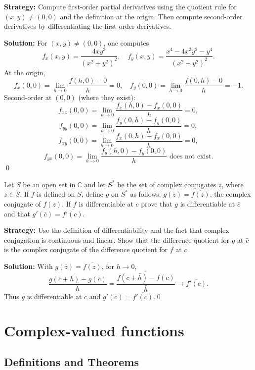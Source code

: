 \noindent\textbf{Strategy:} Compute first-order partial derivatives using the quotient rule for \( (x, y) \neq (0, 0) \) and the definition at the origin. Then compute second-order derivatives by differentiating the first-order derivatives.

\bigskip\noindent\textbf{Solution:}
For $(x,y)\ne(0,0)$, one computes
\[f_x(x,y)=\frac{4xy^3}{(x^2+y^2)^2},\quad f_y(x,y)=\frac{x^4-4x^2y^2-y^4}{(x^2+y^2)^2}.\]
At the origin,
\[f_x(0,0)=\lim_{h\to 0}\frac{f(h,0)-0}{h}=0,\quad f_y(0,0)=\lim_{h\to 0}\frac{f(0,h)-0}{h}=-1.\]
Second-order at $(0,0)$ (where they exist):
\[f_{xx}(0,0)=\lim_{h\to 0}\frac{f_x(h,0)-f_x(0,0)}{h}=0,\] 
\[f_{yy}(0,0)=\lim_{h\to 0}\frac{f_y(0,h)-f_y(0,0)}{h}=0,\]
\[f_{xy}(0,0)=\lim_{h\to 0}\frac{f_x(0,h)-f_x(0,0)}{h}=0,\]
\[f_{yx}(0,0)=\lim_{h\to 0}\frac{f_y(h,0)-f_y(0,0)}{h}\text{ does not exist}.\]\qed


\begin{problembox}
\begin{problemstatement}
Let \( S \) be an open set in \( \mathbb{C} \) and let \( S^* \) be the set of complex conjugates \( \bar{z} \), where \( z \in S \). If \( f \) is defined on \( S \), define \( g \) on \( S^* \) as follows: \( g(\bar{z}) = \overline{f(z)} \), the complex conjugate of \( f(z) \). If \( f \) is differentiable at \( c \) prove that \( g \) is differentiable at \( \bar{c} \) and that \( g'(\bar{c}) = \overline{f'(c)} \).
\end{problemstatement}
\end{problembox}

\noindent\textbf{Strategy:} Use the definition of differentiability and the fact that complex conjugation is continuous and linear. Show that the difference quotient for \( g \) at \( \bar{c} \) is the complex conjugate of the difference quotient for \( f \) at \( c \).

\bigskip\noindent\textbf{Solution:}
With $g(\bar z)=\overline{f(z)}$, for $h\to 0$,
\[\frac{g(\bar c+h)-g(\bar c)}{h}=\overline{\frac{f(c+\bar h)-f(c)}{\bar h}}\to \overline{f'(c)}.\]
Thus $g$ is differentiable at $\bar c$ and $g'(\bar c)=\overline{f'(c)}$.\qed

\section{Complex-valued functions}

\subsection*{Definitions and Theorems}


